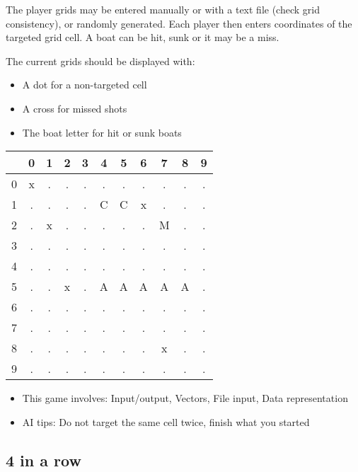 \documentclass{ecnreport}
\begin{document}
The player grids may be entered manually or with a text file (check grid consistency), or randomly generated.
Each player then enters coordinates of the targeted grid cell. A boat can be hit, sunk or it may be a miss. 

The current grids should be displayed with:
\begin{itemize}
 \item A dot for a non-targeted cell
 \item A cross for missed shots
 \item The boat letter for hit or sunk boats
\end{itemize}

\begin{center}
 \begin{tabular}{|c|c|c|c|c|c|c|c|c|c|c|}
 \hline 
 & 0 & 1 & 2& 3&4 &5 &6 & 7&  8&9 \\\hline
 0 &x&.&.&. &.& .&.&.&.&.\\\hline
 1 &.&.&.&. &C&C&x&.&.&.\\\hline
 2 &.&x&.&. &.&.&.&M&.&.\\\hline
 3 &.&.&.&. &.&.&.&.&.&.\\\hline
 4 &.&.&.&. &.&.&.&.&.&.\\\hline
 5 &.&.&x&. &A&A&A&A&A&.\\\hline
 6 &.&.&.&. &.&.&.&.&.&.\\\hline
 7 &.&.&.&. &.&.&.&.&.&.\\\hline
 8 &.&.&.&. &.&.&.&x&.&.\\\hline
 9 &.&.&.&. &.&.&.&.&.&.\\\hline
 \end{tabular}
\end{center}
\begin{itemize}
 \item This game involves: Input/output, Vectors, File input, Data representation
 \item AI tips: Do not target the same cell twice, finish what you started
\end{itemize}


\subsection{4 in a row}
\end{document}
